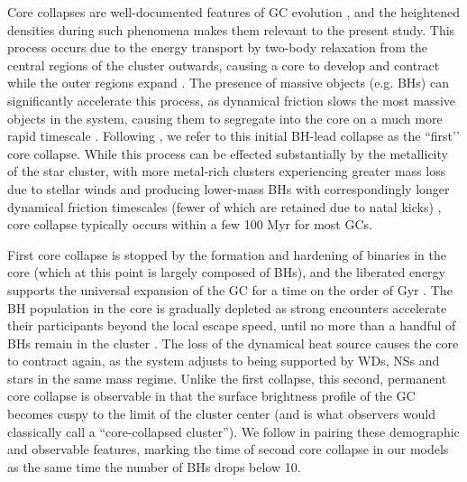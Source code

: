 \documentclass[twocolumn]{aastex631}
\begin{document}
Core collapses are well-documented features of GC evolution \citep[e.g.][]{1968MNRAS.138..495L, 2001A&A...375..711F, 2006MNRAS.368..121F, 2008gady.book.....B, 2020IAUS..351..357K}, and the heightened densities during such phenomena makes them relevant to the present study.
This process occurs due to the energy transport by two-body relaxation from the central regions of the cluster outwards, causing a core to develop and contract while the outer regions expand \citep{2003gmbp.book.....H}.
The presence of massive objects (e.g. BHs) can significantly accelerate this process, as dynamical friction slows the most massive objects in the system, causing them to segregate into the core on a much more rapid timescale \citep{2008gady.book.....B}.
Following \cite{2013MNRAS.432.2779B}, we refer to this initial BH-lead collapse as the ``first’’ core collapse.
While this process can be effected substantially by the metallicity of the star cluster, with more metal-rich clusters experiencing greater mass loss due to stellar winds and producing lower-mass BHs with correspondingly longer dynamical friction timescales (fewer of which are retained due to natal kicks) \citep{2022arXiv220316547R}, core collapse typically occurs within a few 100 Myr for most GCs. 



First core collapse is stopped by the formation and hardening of binaries in the core (which at this point is largely composed of BHs), and the liberated energy supports the universal expansion of the GC for a time on the order of Gyr \citep{2012MNRAS.420..309B}.
The BH population in the core is gradually depleted as strong encounters accelerate their participants beyond the local escape speed, until no more than a handful of BHs remain in the cluster \citep{2013MNRAS.432.2779B, 2020IAUS..351..357K}.
The loss of the dynamical heat source causes the core to contract again, as the system adjusts to being supported by WDs, NSs and stars in the same mass regime.
Unlike the first collapse, this second, permanent core collapse is observable in that the surface brightness profile of the GC becomes cuspy to the limit of the cluster center (and is what observers would classically call a ``core-collapsed cluster'').
We follow \citet{2018ApJ...855L..15K} in pairing these demographic and observable features, marking the time of second core collapse in our models as the same time the number of BHs drops below 10.
\end{document}
